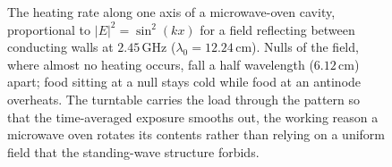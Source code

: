 \begin{figure}[htbp]
\centering
{}
\caption[Standing-wave heating pattern in a microwave-oven cavity]{The
heating rate along one axis of a microwave-oven cavity, proportional to
$|E|^2 = \sin^2(kx)$ for a field reflecting between conducting walls at
$2.45\,\si{\giga\hertz}$ ($\lambda_0 = 12.24\,\si{\centi\meter}$). Nulls
of the field, where almost no heating occurs, fall a half wavelength
($6.12\,\si{\centi\meter}$) apart; food sitting at a null stays cold while
food at an antinode overheats. The turntable carries the load through the
pattern so that the time-averaged exposure smooths out, the working reason
a microwave oven rotates its contents rather than relying on a uniform
field that the standing-wave structure forbids.}
\label{fig:vol04ch10:oven-standing-wave}
\end{figure}
